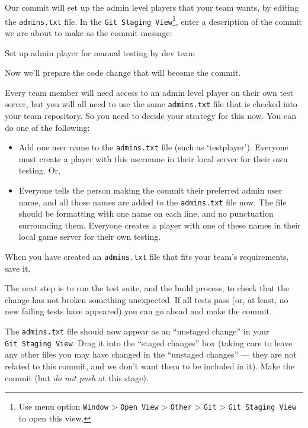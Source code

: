 \documentclass[
]{book}
\newenvironment{Shaded}{\begin{snugshade}}{\end{snugshade}}
\newcommand{\NormalTok}[1]{#1}
\providecommand{\tightlist}{%
  \setlength{\itemsep}{0pt}\setlength{\parskip}{0pt}}
\begin{document}
Our commit will set up the admin level players that your team wants, by editing the \texttt{admins.txt} file. In the \texttt{Git\ Staging\ View}\footnote{Use menu option \texttt{Window} \textgreater{} \texttt{Open\ View} \textgreater{} \texttt{Other} \textgreater{} \texttt{Git} \textgreater{} \texttt{Git\ Staging\ View} to open this view.}, enter a description of the commit we are about to make as the commit message:

\begin{Shaded}
\begin{Highlighting}[]
\NormalTok{Set up admin player for manual testing by dev team}
\end{Highlighting}
\end{Shaded}

Now we'll prepare the code change that will become the commit.

Every team member will need access to an admin level player on their own test server, but you will all need to use the same \texttt{admins.txt} file that is checked into your team repository. So you need to decide your strategy for this now. You can do one of the following:

\begin{itemize}
\tightlist
\item
  Add one user name to the \texttt{admins.txt} file (such as `testplayer'). Everyone must create a player with this username in their local server for their own testing. Or,
\item
  Everyone tells the person making the commit their preferred admin user name, and all those names are added to the \texttt{admins.txt} file now. The file should be formatting with one name on each line, and no punctuation surrounding them. Everyone creates a player with one of these names in their local game server for their own testing.
\end{itemize}

When you have created an \texttt{admins.txt} file that fits your team's requirements, save it.

The next step is to run the test suite, and the build process, to check that the change has not broken something unexpected. If all tests pass (or, at least, no new failing tests have appeared) you can go ahead and make the commit.

The \texttt{admins.txt} file should now appear as an ``unstaged change'' in your \texttt{Git\ Staging\ View}. Drag it into the ``staged changes'' box (taking care to leave any other files you may have changed in the ``unstaged changes'' --- they are not related to this commit, and we don't want them to be included in it). Make the commit (but \emph{do not push} at this stage).
\end{document}
